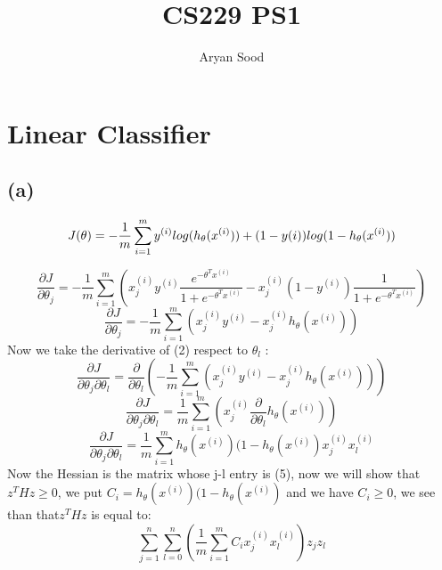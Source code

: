 \documentclass[11pt]{article}
\title{CS229 PS1}
\author{Aryan Sood}
\date{}
\begin{document}
\maketitle

\section{Linear Classifier}
\subsection{(a)}
    
\begin{equation}
    \\J(\theta) = -\frac{1}{m}\sum\limits_{i = 1}^{m} y^{(i)} log(h_{\theta}(x^{(i)}))+(1-y{(i)})log(1-h_{\theta}(x^{(i)}))
    \\
\end{equation}

\begin{equation*}
    \frac{\partial J}{\partial \theta_{j}} = -\frac{1}{m}\sum\limits_{i=1}^{m}(x_{j}^{(i)}y^{(i)}\frac{e^{-\theta^{T}x^{(i)}}}{1+e^{-\theta^{T}x^{(i)}}}-x_{j}^{(i)}(1-y^{(i)})\frac{1}{1+e^{-\theta^{T}x^{(i)}}})
\end{equation*}
\begin{equation}
    \frac{\partial J}{\partial \theta_{j}} = -\frac{1}{m}\sum\limits_{i=1}^{m}(x_{j}^{(i)}y^{(i)}-x_{j}^{(i)}h_{\theta}(x^{(i)}))
\end{equation}
Now we take the derivative of (2) respect to $\theta_{l}$ :
\begin{equation}
    \frac{\partial J}{\partial \theta_{j}\partial \theta_{l}} =\frac{\partial}{\partial\theta_{l}} (-\frac{1}{m}\sum\limits_{i=1}^{m}(x_{j}^{(i)}y^{(i)}-x_{j}^{(i)}h_{\theta}(x^{(i)})))
\end{equation}
\begin{equation}
    \frac{\partial J}{\partial \theta_{j}\partial \theta_{l}} =\frac{1}{m}\sum\limits_{i=1}^{m}(x_{j}^{(i)}\frac{\partial}{\partial\theta_{l}}h_{\theta}(x^{(i)}))
\end{equation}
\begin{equation}
    \frac{\partial J}{\partial \theta_{j}\partial \theta_{l}} =\frac{1}{m}\sum\limits_{i=1}^{m}h_{\theta}(x^{(i)})(1-h_{\theta}(x^{(i)})x_{j}^{(i)}x_{l}^{(i)}
\end{equation}
Now the Hessian is the matrix whose j-l entry is (5), now we will show that $z^{T}Hz \geq 0$, we put $C_{i} = h_{\theta}(x^{(i)})(1-h_{\theta}(x^{(i)})$ and we have $C_{i}\geq 0$, we see than that$z^{T}Hz$ is equal to:
\begin{equation}
    \sum\limits_{j=1}^{n}\sum\limits_{l=0}^{n}(\frac{1}{m}\sum\limits_{i=1}^{m}C_{i}x_{j}^{(i)}x_{l}^{(i)})z_{j}z_{l}
\end{equation}
\end{document}
